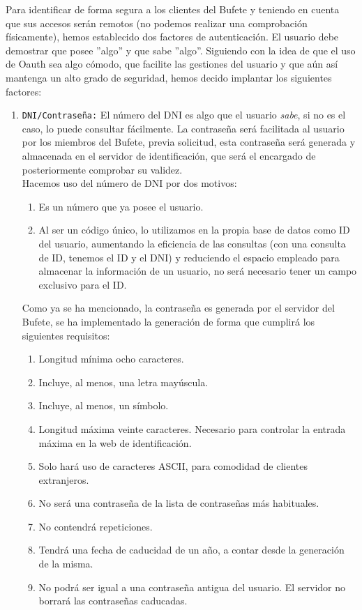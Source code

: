 \documentclass[a4,12pt,onecolum]{article}
\begin{document}
Para identificar de forma segura a los clientes del Bufete y teniendo en cuenta que sus accesos serán remotos (no podemos realizar una comprobación físicamente), hemos establecido dos factores de autenticación. El usuario debe demostrar que posee ''algo'' y que sabe ''algo''. Siguiendo con la idea de que el uso de Oauth sea algo cómodo, que facilite las gestiones del usuario y que aún así mantenga un alto grado de seguridad, hemos decido implantar los siguientes factores:

\begin{enumerate}
	\item \texttt{DNI/Contraseña:} El número del DNI es algo que el usuario \emph{sabe}, si no es el caso, lo 		puede consultar fácilmente. La contraseña será facilitada al usuario por los miembros del Bufete, previa 		solicitud, esta contraseña será generada y almacenada en el servidor de identificación, que será el 			encargado de posteriormente comprobar su validez. \\
	Hacemos uso del número de DNI por dos motivos:
	\begin{enumerate}
		\item Es un número que ya posee el usuario.
		\item Al ser un código único, lo utilizamos en la propia base de datos como ID del usuario, aumentando 			la eficiencia de las consultas (con una consulta de ID, tenemos el ID y el DNI) y reduciendo el espacio 		empleado para almacenar la información de un usuario, no será necesario tener un campo exclusivo para 			el ID. \\
	\end{enumerate}

	Como ya se ha mencionado, la contraseña es generada por el servidor del Bufete, se ha implementado la 			generación de forma que cumplirá los siguientes requisitos:
	\begin{enumerate}
		\item Longitud mínima ocho caracteres.
		\item Incluye, al menos, una letra mayúscula.
		\item Incluye, al menos, un símbolo.
		\item Longitud máxima veinte caracteres. Necesario para controlar la entrada máxima en la web de 				identificación.
		\item Solo hará uso de caracteres ASCII, para comodidad de clientes extranjeros.
		\item No será una contraseña de la lista de contraseñas más habituales.
		\item No contendrá repeticiones.
		\item Tendrá una fecha de caducidad de un año, a contar desde la generación de la misma.
		\item No podrá ser igual a una contraseña antigua del usuario. El servidor no borrará las contraseñas 			caducadas.
	\end{enumerate}


\end{enumerate}
\end{document}
